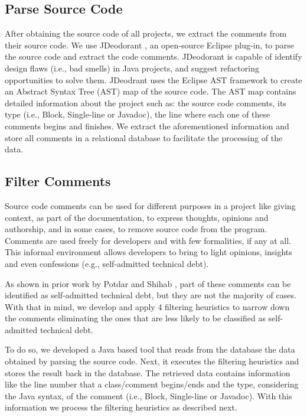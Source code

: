 \subsection{Parse Source Code} %
\label{sub:parse_source_code}

After obtaining the source code of all projects, we extract the comments from their source code. We use JDeodorant \cite{Tsantalis2008CSMR}, an open-source Eclipse plug-in, to parse the source code and extract the code comments. JDeodorant is capable of identify design flaws (i.e., bad smells) in Java projects, and suggest refactoring opportunities to solve them. JDeodrant uses the Eclipse AST framework to create an Abstract Syntax Tree (AST) map of the source code. The AST map contains detailed information about the project such as: the source code comments, its type (i.e., Block, Single-line or Javadoc), the line where each one of these comments begins and finishes. We extract the aforementioned information and store all comments in a relational database to facilitate the processing of the data.

\subsection{Filter Comments} %
\label{sub:filter_comments}

Source code comments can be used for different purposes in a project like giving context, as part of the documentation, to express thoughts, opinions and authorship, and in some cases, to remove source code from the program. Comments are used freely for developers and with few formalities, if any at all. This informal environment allows developers to bring to light opinions, insights and even confessions (e.g., self-admitted technical debt). 

As shown in prior work by Potdar and Shihab \cite{Potdar2014ICSME}, part of these comments can be identified as self-admitted technical debt, but they are not the majority of cases. With that in mind, we develop and apply 4 filtering heuristics to narrow down the comments eliminating the ones that are less likely to be classified as self-admitted technical debt.

To do so, we developed a Java based tool that reads from the database the data obtained by parsing the source code. Next, it executes the filtering heuristics and stores the result back in the database. The retrieved data contains information like the line number that a class/comment begins/ends and the type, considering the Java syntax, of the comment (i.e., Block, Single-line or Javadoc). With this information we process the filtering heuristics as described next.

